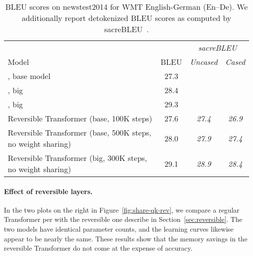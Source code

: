 \begin{table}
\caption{BLEU scores on newstest2014 for WMT English-German (En–De). We additionally report detokenized BLEU scores as computed by sacreBLEU~\citep{sacrebleu}.}
\label{tab:wmt}
\begin{center}
\begin{tabular}{lccc}
&& \multicolumn{2}{c}{\textit{sacreBLEU}} \\
Model & BLEU & \textit{Uncased}\footnotemark[3] & \textit{Cased}\footnotemark[4] \\
\hline
\citet{transformer}, base model & 27.3 \\
\citet{transformer}, big & 28.4 \\
\citet{ott2018scaling}, big & 29.3 \\
\hline
Reversible Transformer (base, 100K steps) & 27.6 & \textit{27.4} & \textit{26.9} \\
Reversible Transformer (base, 500K steps, no weight sharing) & 28.0 & \textit{27.9} & \textit{27.4} \\
Reversible Transformer (big, 300K steps, no weight sharing) & 29.1 & \textit{28.9} & \textit{28.4}
\end{tabular}
\end{center}
\end{table}


\paragraph{Effect of reversible layers.} \label{sec:exp_rev}
In the two plots on the right in Figure~\ref{fig:share-qk-rev}, we compare a regular Transformer per \citet{transformer} with the reversible one describe in Section~\ref{sec:reversible}. The two models have identical parameter counts, and the learning curves likewise appear to be nearly the same. These results show that the memory savings in the reversible Transformer do not come at the expense of accuracy.

